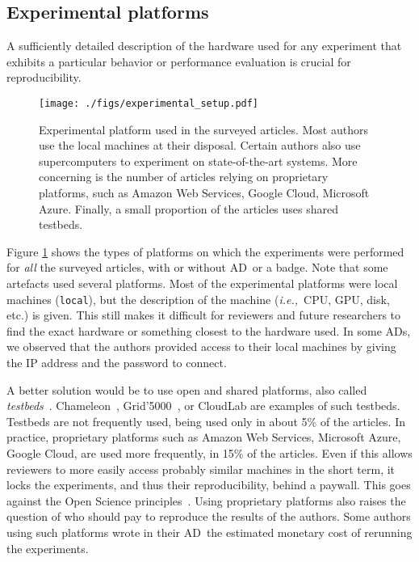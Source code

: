 \documentclass[sigconf,natbib=false]{acmart}
\newcommand{\ie}{\emph{i.e.,}}
\newcommand{\ad}{AD}
\begin{document}
\subsection{Experimental platforms}\label{sec:sop:expe}

A sufficiently detailed description of the hardware used for any experiment that exhibits a particular behavior or performance evaluation is crucial for reproducibility.

\begin{figure}
  \centering
  \texttt{[image: ./figs/experimental\_setup.pdf]}
  \caption{Experimental platform used in the surveyed articles.
  Most authors use the local machines at their disposal.
  Certain authors also use supercomputers to experiment on state-of-the-art systems.
  More concerning is the number of articles relying on proprietary platforms, such as Amazon Web Services, Google Cloud, Microsoft Azure.
  Finally, a small proportion of the articles uses shared testbeds.
  }
  \label{fig:experimental_setup}
\end{figure}

Figure \ref{fig:experimental_setup} shows the types of platforms on which the experiments were performed for \emph{all} the surveyed articles, with or without \ad\ or a badge.
Note that some artefacts used several platforms.
Most of the experimental platforms were local machines (\texttt{local}), but the description of the machine (\ie\ CPU, GPU, disk, etc.) is given.
This still makes it difficult for reviewers and future researchers to find the exact hardware or something closest to the hardware used.
In some \ad s, we observed that the authors provided access to their local machines by giving the IP address and the password to connect.

A better solution would be to use open and shared platforms, also called \emph{testbeds}\ \cite{nussbaum2017testbeds}.
Chameleon\ \cite{chameleon}, Grid'5000\ \cite{grid5000}, or CloudLab \cite{cloudlab} are examples of such testbeds.
Testbeds are not frequently used, being used only in about 5\% of the articles.
In practice, proprietary platforms such as Amazon Web Services, Microsoft Azure, Google Cloud, are used more frequently, in 15\% of the articles.
Even if this allows reviewers to more easily access probably similar machines in the short term, it locks the experiments, and thus their reproducibility, behind a paywall.
This goes against the Open Science principles\ \cite{openscience_unesco}.
Using proprietary platforms also raises the question of who should pay to reproduce the results of the authors.
Some authors using such platforms wrote in their \ad\ the estimated monetary cost of rerunning the experiments.
\end{document}

